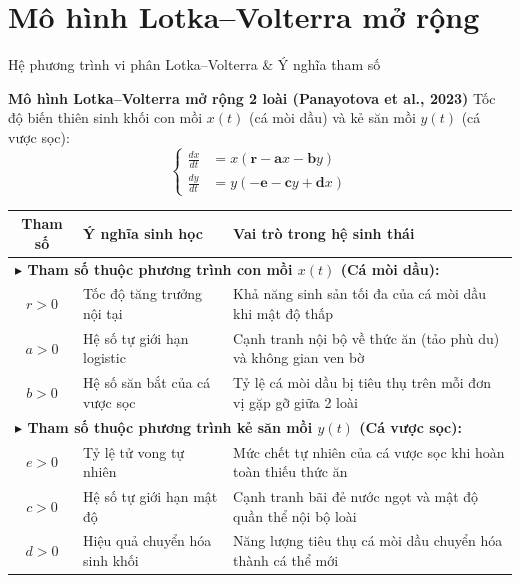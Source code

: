 \documentclass[aspectratio=169, 10pt]{beamer}
\begin{document}
\section{Mô hình Lotka--Volterra mở rộng}

\begin{frame}{Hệ phương trình vi phân Lotka--Volterra \& Ý nghĩa tham số}
  \vspace*{-0.2cm}
  \begin{block}{\textbf{Mô hình Lotka--Volterra mở rộng 2 loài (Panayotova et al., 2023)}}
    \footnotesize
    Tốc độ biến thiên sinh khối con mồi $x(t)$ (cá mòi dầu) và kẻ săn mồi $y(t)$ (cá vược sọc):
    \begin{equation}
    \label{eq:lv_system}
    \left\{
    \begin{aligned}
    \frac{dx}{dt} &= x(\mathbf{r} - \mathbf{a}x - \mathbf{b}y) \\
    \frac{dy}{dt} &= y(-\mathbf{e} - \mathbf{c}y + \mathbf{d}x)
    \end{aligned}
    \right.
    \end{equation}
  \end{block}

  \vspace{0.05cm}

  \begin{center}
  \scriptsize
  \renewcommand{\arraystretch}{1.10}
  \begin{tabularx}{\textwidth}{c l X}
    \toprule
    \textbf{Tham số} & \textbf{Ý nghĩa sinh học} & \textbf{Vai trò trong hệ sinh thái} \\
    \midrule
    \multicolumn{3}{l}{\textbf{\color{OceanNavy}$\blacktriangleright$ Tham số thuộc phương trình con mồi $x(t)$ (Cá mòi dầu):}} \\
    $r > 0$ & Tốc độ tăng trưởng nội tại & Khả năng sinh sản tối đa của cá mòi dầu khi mật độ thấp \\
    $a > 0$ & Hệ số tự giới hạn logistic & Cạnh tranh nội bộ về thức ăn (tảo phù du) và không gian ven bờ \\
    $b > 0$ & Hệ số săn bắt của cá vược sọc & Tỷ lệ cá mòi dầu bị tiêu thụ trên mỗi đơn vị gặp gỡ giữa 2 loài \\
    \midrule
    \multicolumn{3}{l}{\textbf{\color{OceanNavy}$\blacktriangleright$ Tham số thuộc phương trình kẻ săn mồi $y(t)$ (Cá vược sọc):}} \\
    $e > 0$ & Tỷ lệ tử vong tự nhiên & Mức chết tự nhiên của cá vược sọc khi hoàn toàn thiếu thức ăn \\
    $c > 0$ & Hệ số tự giới hạn mật độ & Cạnh tranh bãi đẻ nước ngọt và mật độ quần thể nội bộ loài \\
    $d > 0$ & Hiệu quả chuyển hóa sinh khối & Năng lượng tiêu thụ cá mòi dầu chuyển hóa thành cá thể mới \\
    \bottomrule
  \end{tabularx}
  \end{center}
\end{frame}
\end{document}
